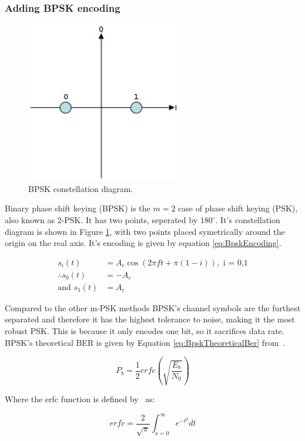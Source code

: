 \documentclass[12pt,onecolumn,letterpaper]{article}
\begin{document}
\subsubsection{Adding BPSK encoding}
\label{sec:AddingBpsk}

\begin{figure}[t]
   \centering
   \includegraphics[width=0.2\linewidth]{figures/bpsk_const_diag.jpg}
   \caption{BPSK constellation diagram.}
   \label{fig:BspkConstDiag}
\end{figure}

Binary phase shift keying (BPSK) is the $m = 2$ case of phase shift keying (PSK), also known as 2-PSK. It has two points, seperated by $180^\circ$. It's constellation diagram is shown in Figure \ref{fig:BspkConstDiag}, with two points placed symetrically around the origin on the real axis. It's encoding is given by equation \ref{eq:BpskEncoding}.

\begin{subequations}
\begin{align}
   s_i(t) &= A_c \cos(2\pi ft + \pi(1-i)), \mbox{ i = 0,1} \label{eq:BpskEncoding} \\
   \therefore s_0(t) &= -A_c \\
   \mbox{and } s_1(t) &= A_c
\end{align}
\end{subequations}

Compared to the other m-PSK methods BPSK's channel symbols are the furthest separated and therefore it has the highest tolerance to noise, making it the most robust PSK. This is because it only encodes one bit, so it sacrifices data rate. BPSK's theoretical BER is given by Equation \ref{eq:BpskTheoreticalBer} from~\cite{BpskPe}.

\begin{equation}
   P_b = \frac{1}{2}erfc\left(\sqrt{\frac{E_b}{N_0}}\right)
   \label{eq:BpskTheoreticalBer}
\end{equation}

Where the erfc function is defined by~\cite{ErfcDefinition} as:

\begin{equation}
   erfc = \frac{2}{\sqrt{\pi}}\int_{x=0}^{\infty}e^{-t^2}dt
   \label{eq:ErfcDef}
\end{equation}
\end{document}
